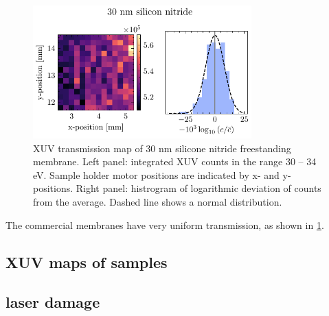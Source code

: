 \begin{figure}
	\centering
	\includegraphics[width=0.75\textwidth]{figures/chap4/nitride_map.pdf}
	\caption{XUV transmission map of 30 nm silicone nitride freestanding membrane. Left panel: integrated XUV counts in the range 30 -- 34 eV. Sample holder motor positions are indicated by x- and y-positions. Right panel: histrogram of logarithmic deviation of counts from the average. Dashed line shows a normal distribution.}
	\label{fig:nitride_map}
\end{figure}

The commercial membranes have very uniform transmission, as shown in \cref{fig:nitride_map}.




\subsection{XUV maps of samples}


\subsection{laser damage}

